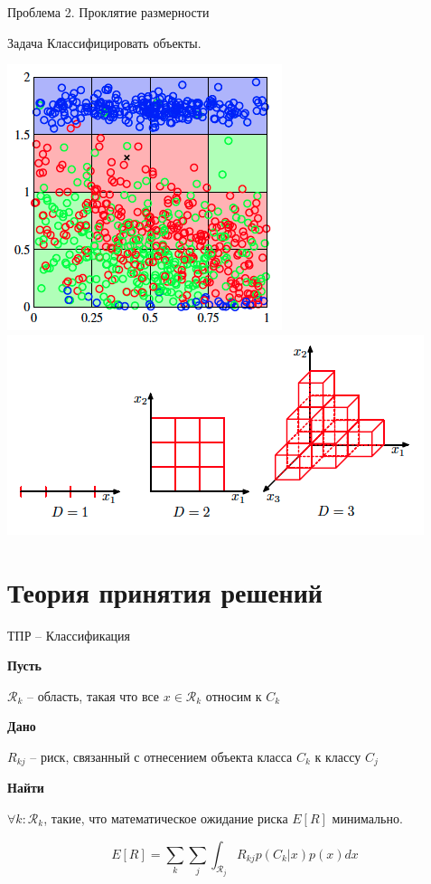 \documentclass[10pt]{beamer}
\begin{document}
\begin{frame}{Проблема 2. Проклятие размерности}

\begin{block}{Задача}
Классифицировать объекты.
\end{block}

\begin{center}
\includegraphics[scale=0.3]{images/pts.png}
\includegraphics[scale=0.4]{images/curse.png}
\end{center}

\end{frame}

\section{Теория принятия решений}

\begin{frame}{ТПР -- Классификация}

{\bf Пусть}

$\mathcal{R}_k$ -- область, такая что все $x \in \mathcal{R}_k$ относим к $C_k$

{\bf Дано}

$R_{kj}$ -- риск, связанный с отнесением объекта класса $C_k$ к классу $C_j$

{\bf Найти}

$\forall k: \mathcal{R}_k$, такие, что математическое ожидание риска $E[R]$ минимально.

\[
E[R] = \sum_k \sum_j \int_{\mathcal{R}_j} R_{kj} p(C_k | x) p(x) dx
\]

\end{frame}
\end{document}
